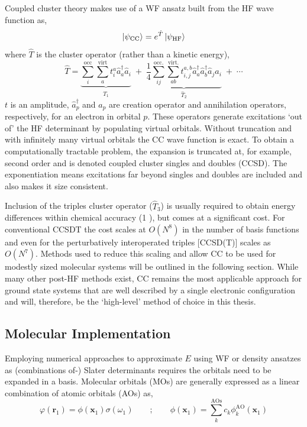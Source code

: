 \documentclass[main.tex]{subfiles}
\begin{document}
Coupled cluster theory makes use of a WF ansatz built from the HF wave function as,
\begin{equation}
\ket{\psi_\text{CC}} = {e}^{\hat{T}}\ket{\psi_\text{HF}}
\end{equation}
where $\hat{T}$ is the cluster operator (rather than a kinetic energy),
\begin{equation}
\hat{T} = \underbrace{\sum_i^\text{occ}\sum_a^\text{virt} t_i^a \hat{a}^\dagger_a\hat{a}_i }_{\hat{T}_1} \;+\; \underbrace{\frac{1}{4}\sum_{ij}^\text{occ.}\sum_{ab}^\text{virt.}t_{i, j}^{a, b} \hat{a}_a^\dagger\hat{a}_b^\dagger \hat{a}_j \hat{a}_i}_{\hat{T}_2} \;+ \;\cdots
\end{equation}
$t$ is an amplitude, $\hat{a}^\dagger_p$ and $\hat{a}_p$ are creation operator and annihilation operators, respectively, for an electron in orbital $p$. These operators  generate excitations `out of' the HF determinant by populating virtual orbitals. Without truncation and with infinitely many virtual orbitals the CC wave function is exact. To obtain a computationally tractable problem, the expansion is truncated at, for example, second order and is denoted coupled cluster singles and doubles (CCSD). The exponentiation means excitations far beyond singles and doubles are included and also makes it size consistent. 


Inclusion of the triples cluster operator ($\hat{T}_3$) is usually required to obtain energy differences within chemical accuracy (1 \kcal),\cite{Deustua2021} but comes at a significant cost. For conventional CCSDT the cost scales at $O(N^8)$ in the number of basis functions and even for the perturbatively interoperated triples [CCSD(T)] scales as $O(N^7)$. Methods used to reduce this scaling and allow CC to be used for modestly sized molecular systems will be outlined in the following section. While many other post-HF methods exist,\cite{SzaboOstlund} CC remains the most applicable approach for ground state systems that are well described by a single electronic configuration and will, therefore, be the `high-level' method of choice in this thesis.  


\subsection{Molecular Implementation}

Employing numerical approaches to approximate $E$ using WF or density ansatzes as (combinations of-) Slater determinants requires the orbitals need to be expanded in a basis. Molecular orbitals (MOs) are generally expressed as a linear combination of atomic orbitals (AOs) as,
\begin{equation}
	\varphi(\boldsymbol{r}_1) = \phi(\boldsymbol{x}_1)\sigma(\omega_1) \qquad ; \qquad \phi(\boldsymbol{x}_1) = \sum_{k}^\text{AOs} c_k\phi_k^\text{AO}(\boldsymbol{x}_1)
\end{equation}
\end{document}
